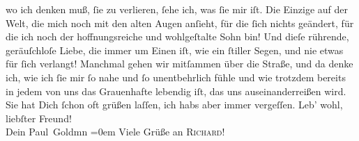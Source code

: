\begin{ledgroupsized}[t]{13cm}
               wo ich denken muß, ſie zu verlieren, ſehe ich, was ſie mir iſt. Die Einzige auf der Welt, die mich noch  mit den alten {\pb}Augen anſieht, für die ſich nichts geändert, für die
               ich noch der hoffnungsreiche und wohlgeſtalte Sohn bin! Und dieſe rührende,
               geräuſchloſe Liebe, die immer um Einen iſt, wie ein ſtiller Segen, und nie etwas für
               ſich verlangt! Manchmal gehen wir mitſammen über die Straße, und da denke ich, wie
                   ich ſie mir ſo nahe und ſo unentbehrlich
               fühle und wie trotzdem bereits in jedem von uns das Grauenhafte lebendig iſt, das uns
               auseinanderreißen wird.\pend
           \pstart
           Sie hat Dich ſchon oft grüßen laſſen, ich habs aber immer vergeſſen.\pend
           \pstart
           Leb' wohl, liebſter Freund! {\\[\baselineskip]}Dein \spacefill\mbox{Paul Goldmn}\pend
           \leftskip=0em{}\pstart
           \noindent{}Viele Grüße an \textsc{Richard}!\pend
           
         
         \endnumbering{}\end{ledgroupsized}  \newcommand{\dateiname}{L02741}\newcommand{\titel}{Paul Goldmann an Arthur Schnitzler, 25. 7. [1895]}\newcommand{\editorInnen}{Martin Anton Müller und Laura Untner}
      